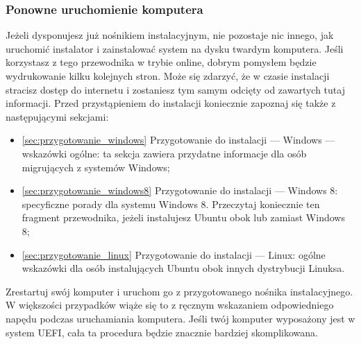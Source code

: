 \subsubsection{Ponowne uruchomienie komputera}
Jeżeli dysponujesz już  nośnikiem instalacyjnym, nie pozostaje nic innego, jak uruchomić instalator i zainstalować system na dysku twardym komputera. Jeśli korzystasz z tego przewodnika w trybie online, dobrym pomysłem będzie wydrukowanie kilku kolejnych stron. Może się zdarzyć, że w czasie instalacji stracisz dostęp do internetu i zostaniesz tym samym odcięty od zawartych tutaj informacji.
Przed przystąpieniem do instalacji koniecznie zapoznaj się także z następującymi sekcjami:
\begin{itemize}
\item \ref{sec:przygotowanie_windows} \textcolor{ubuntu_orange}{Przygotowanie do instalacji --- Windows --- wskazówki ogólne}: ta sekcja zawiera przydatne informacje dla osób migrujących z systemów Windows;
\item \ref{sec:przygotowanie_windows8} \textcolor{ubuntu_orange}{Przygotowanie do instalacji --- Windows 8}: specyficzne porady dla systemu Windows 8. Przeczytaj koniecznie ten fragment przewodnika, jeżeli instalujesz Ubuntu obok lub zamiast Windows 8;

\item \ref{sec:przygotowanie_linux} \textcolor{ubuntu_orange}{Przygotowanie do instalacji --- Linux}: ogólne wskazówki dla osób instalujących Ubuntu obok innych dystrybucji Linuksa.
\end{itemize}

Zrestartuj swój komputer i uruchom go z przygotowanego nośnika instalacyjnego. W większości przypadków wiąże się to z ręcznym wskazaniem odpowiedniego napędu podczas uruchamiania komputera. Jeśli twój komputer wyposażony jest w system UEFI, cała ta procedura będzie znacznie bardziej skomplikowana.
